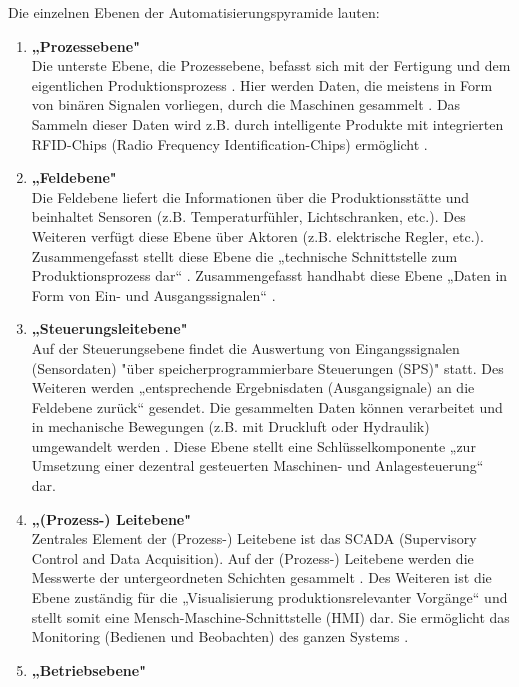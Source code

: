 \noindent Die einzelnen Ebenen der Automatisierungspyramide lauten:
\begin{enumerate}
	\item \textbf{„Prozessebene"} \cite[S.49]{14} \\
	Die unterste Ebene, die Prozessebene, befasst sich mit der Fertigung und dem eigentlichen Produktionsprozess \cite[S.49]{14}. Hier werden Daten, die meistens in Form von binären Signalen vorliegen, durch die Maschinen gesammelt \cite[S.405]{15}. Das Sammeln dieser Daten wird z.B. durch intelligente Produkte mit integrierten RFID-Chips (Radio Frequency Identification-Chips) ermöglicht \cite[S.49]{14}.
	\item \textbf{„Feldebene"} \cite[S.50]{14} \\
	Die Feldebene liefert die Informationen über die Produktionsstätte und beinhaltet Sensoren (z.B. Temperaturfühler, Lichtschranken, etc.). Des Weiteren verfügt diese Ebene über Aktoren (z.B. elektrische Regler, etc.). Zusammengefasst stellt diese Ebene die „technische Schnittstelle zum Produktionsprozess dar“ \cite[S.405]{15}. Zusammengefasst handhabt diese Ebene „Daten in Form von Ein- und Ausgangssignalen“ \cite[S.50]{14}.
	\item \textbf{„Steuerungsleitebene"} \cite[S.50]{14} \\
	Auf der Steuerungsebene findet die Auswertung von Eingangssignalen (Sensordaten) "über speicherprogrammierbare Steuerungen (SPS)" \cite[S.50]{14} statt. Des Weiteren werden „entsprechende Ergebnisdaten (Ausgangsignale) an die Feldebene zurück“ \cite[S.50]{14} gesendet. Die gesammelten Daten können verarbeitet und in mechanische Bewegungen (z.B. mit Druckluft oder Hydraulik) umgewandelt werden \cite[S.50]{14}. Diese Ebene stellt eine Schlüsselkomponente „zur Umsetzung einer dezentral gesteuerten Maschinen- und Anlagesteuerung“ \cite[S.50]{14} dar.
	\item \textbf{„(Prozess-) Leitebene"} \cite[S.50]{14} \\
	Zentrales Element der (Prozess-) Leitebene ist das SCADA (Supervisory Control and Data Acquisition). Auf der (Prozess-) Leitebene werden die Messwerte der untergeordneten Schichten gesammelt \cite[S.405]{15}. Des Weiteren ist die Ebene zuständig für die „Visualisierung produktionsrelevanter Vorgänge“ \cite[S.50]{14} und stellt somit eine Mensch-Maschine-Schnittstelle (HMI) dar. Sie ermöglicht das Monitoring (Bedienen und Beobachten) des ganzen Systems \cite[S.405]{15}.
	\item \textbf{„Betriebsebene"} \cite[S.50]{14} \\

\end{enumerate}
